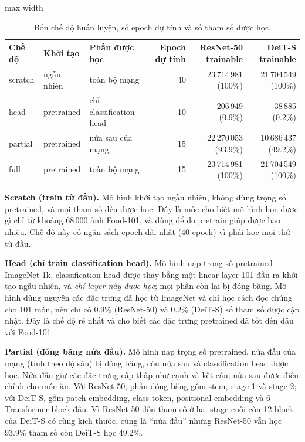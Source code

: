 \documentclass[11pt,a4paper]{article}
\begin{document}
\begin{table}[!htbp]
\centering
\small
\begin{adjustbox}{max width=\linewidth}
\begin{tabular}{lllrrr}
\toprule
Chế độ & Khởi tạo & Phần được học & Epoch dự tính & ResNet-50 trainable & DeiT-S trainable \\
\midrule
scratch & ngẫu nhiên & toàn bộ mạng & 40 & 23\,714\,981 (100\%) & 21\,704\,549 (100\%) \\
head & pretrained & chỉ classification head & 10 & 206\,949 (0.9\%) & 38\,885 (0.2\%) \\
partial & pretrained & nửa sau của mạng & 15 & 22\,270\,053 (93.9\%) & 10\,686\,437 (49.2\%) \\
full & pretrained & toàn bộ mạng & 15 & 23\,714\,981 (100\%) & 21\,704\,549 (100\%) \\
\bottomrule
\end{tabular}
\end{adjustbox}
\caption{Bốn chế độ huấn luyện, số epoch dự tính và số tham số được học.}
\label{tab:a1-modes}
\end{table}

\textbf{Scratch (train từ đầu).} Mô hình khởi tạo ngẫu nhiên, không dùng trọng số pretrained, và mọi tham số đều được học. Đây là mốc cho biết mô hình học được gì chỉ từ khoảng 68\,000 ảnh Food-101, và dùng để đo pretrain giúp được bao nhiêu. Chế độ này có ngân sách epoch dài nhất (40 epoch) vì phải học mọi thứ từ đầu.

\textbf{Head (chỉ train classification head).} Mô hình nạp trọng số pretrained ImageNet-1k, classification head được thay bằng một linear layer 101 đầu ra khởi tạo ngẫu nhiên, và \emph{chỉ layer này được học}; mọi phần còn lại bị đóng băng. Mô hình dùng nguyên các đặc trưng đã học từ ImageNet và chỉ học cách đọc chúng cho 101 món, nên chỉ có 0.9\% (ResNet-50) và 0.2\% (DeiT-S) số tham số được cập nhật. Đây là chế độ rẻ nhất và cho biết các đặc trưng pretrained đã tốt đến đâu với Food-101.

\textbf{Partial (đóng băng nửa đầu).} Mô hình nạp trọng số pretrained, nửa đầu của mạng (tính theo độ sâu) bị đóng băng, còn nửa sau và classification head được học. Nửa đầu giữ các đặc trưng cấp thấp như cạnh và kết cấu; nửa sau được điều chỉnh cho món ăn. Với ResNet-50, phần đóng băng gồm stem, stage 1 và stage 2; với DeiT-S, gồm patch embedding, class token, positional embedding và 6 Transformer block đầu. Vì ResNet-50 dồn tham số ở hai stage cuối còn 12 block của DeiT-S có cùng kích thước, cùng là ``nửa đầu'' nhưng ResNet-50 vẫn học 93.9\% tham số còn DeiT-S học 49.2\%.
\end{document}
